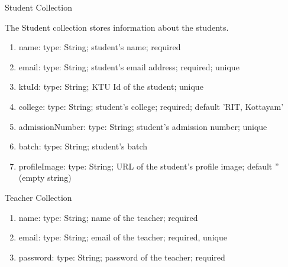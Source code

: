 \begin{frame}{Student Collection}

The Student collection stores information about the students.
\begin{enumerate}

\item  name: {type: String}; student's name; required
\item email: {type: String}; student's email address; required; unique
\item ktuId: {type: String}; KTU Id of the student; unique
\item college: {type: String}; student's college; required; default 'RIT, Kottayam'
\item admissionNumber: {type: String}; student's admission number; unique
\item batch: {type: String}; student's batch
\item profileImage: {type: String}; URL of the student's profile image; default '' (empty string)
   \end{enumerate} 
\end{frame}

\begin{frame}{Teacher Collection}

\begin{enumerate}
  

 \item name: {type: String}; name of the teacher; required
\item email: {type: String}; email of the teacher; required, unique
\item password: {type: String}; password of the teacher; required
\end{enumerate}    
\end{frame}


